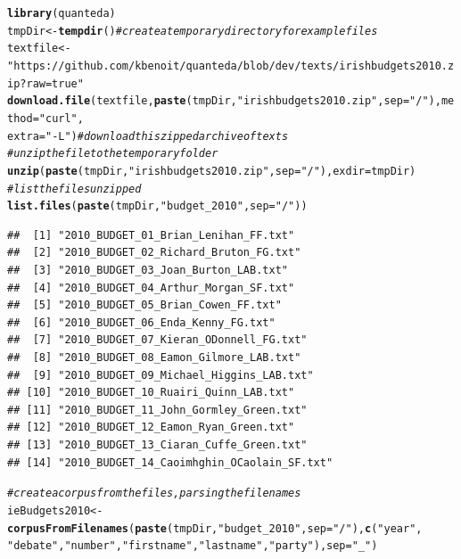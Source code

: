 \documentclass[11pt]{article}\usepackage[]{graphicx}\usepackage[]{color}
\makeatletter
\newcommand{\hlstr}[1]{\textcolor[rgb]{0.192,0.494,0.8}{#1}}%
\newcommand{\hlcom}[1]{\textcolor[rgb]{0.678,0.584,0.686}{\textit{#1}}}%
\newcommand{\hlstd}[1]{\textcolor[rgb]{0.345,0.345,0.345}{#1}}%
\newcommand{\hlkwb}[1]{\textcolor[rgb]{0.69,0.353,0.396}{#1}}%
\newcommand{\hlkwc}[1]{\textcolor[rgb]{0.333,0.667,0.333}{#1}}%
\newcommand{\hlkwd}[1]{\textcolor[rgb]{0.737,0.353,0.396}{\textbf{#1}}}%
\newenvironment{kframe}{%
 \def\at@end@of@kframe{}%
 \ifinner\ifhmode%
  \def\at@end@of@kframe{\end{minipage}}%
  \begin{minipage}{\columnwidth}%
 \fi\fi%
 \def\FrameCommand##1{\hskip\@totalleftmargin \hskip-\fboxsep
 \colorbox{shadecolor}{##1}\hskip-\fboxsep
     \hskip-\linewidth \hskip-\@totalleftmargin \hskip\columnwidth}%
 \MakeFramed {\advance\hsize-\width
   \@totalleftmargin\z@ \linewidth\hsize
   \@setminipage}}%
 {\par\unskip\endMakeFramed%
 \at@end@of@kframe}
\newenvironment{knitrout}{}{} %
\makeatother
\begin{document}
\begin{knitrout}\footnotesize
{}\color{fgcolor}\begin{kframe}
\begin{alltt}
\hlkwd{library}\hlstd{(quanteda)}
\hlstd{tmpDir} \hlkwb{<-} \hlkwd{tempdir}\hlstd{()}  \hlcom{# create a temporary directory for example files}
\hlstd{textfile} \hlkwb{<-} \hlstr{"https://github.com/kbenoit/quanteda/blob/dev/texts/irishbudgets2010.zip?raw=true"}
\hlkwd{download.file}\hlstd{(textfile,} \hlkwd{paste}\hlstd{(tmpDir,} \hlstr{"irishbudgets2010.zip"}\hlstd{,} \hlkwc{sep} \hlstd{=} \hlstr{"/"}\hlstd{),} \hlkwc{method} \hlstd{=} \hlstr{"curl"}\hlstd{,}
    \hlkwc{extra} \hlstd{=} \hlstr{"-L"}\hlstd{)}  \hlcom{# download this zipped archive of texts}
\hlcom{# unzip the file to the temporary folder}
\hlkwd{unzip}\hlstd{(}\hlkwd{paste}\hlstd{(tmpDir,} \hlstr{"irishbudgets2010.zip"}\hlstd{,} \hlkwc{sep} \hlstd{=} \hlstr{"/"}\hlstd{),} \hlkwc{exdir} \hlstd{= tmpDir)}
\hlcom{# list the files unzipped}
\hlkwd{list.files}\hlstd{(}\hlkwd{paste}\hlstd{(tmpDir,} \hlstr{"budget_2010"}\hlstd{,} \hlkwc{sep} \hlstd{=} \hlstr{"/"}\hlstd{))}
\end{alltt}
\begin{verbatim}
##  [1] "2010_BUDGET_01_Brian_Lenihan_FF.txt"      
##  [2] "2010_BUDGET_02_Richard_Bruton_FG.txt"     
##  [3] "2010_BUDGET_03_Joan_Burton_LAB.txt"       
##  [4] "2010_BUDGET_04_Arthur_Morgan_SF.txt"      
##  [5] "2010_BUDGET_05_Brian_Cowen_FF.txt"        
##  [6] "2010_BUDGET_06_Enda_Kenny_FG.txt"         
##  [7] "2010_BUDGET_07_Kieran_ODonnell_FG.txt"    
##  [8] "2010_BUDGET_08_Eamon_Gilmore_LAB.txt"     
##  [9] "2010_BUDGET_09_Michael_Higgins_LAB.txt"   
## [10] "2010_BUDGET_10_Ruairi_Quinn_LAB.txt"      
## [11] "2010_BUDGET_11_John_Gormley_Green.txt"    
## [12] "2010_BUDGET_12_Eamon_Ryan_Green.txt"      
## [13] "2010_BUDGET_13_Ciaran_Cuffe_Green.txt"    
## [14] "2010_BUDGET_14_Caoimhghin_OCaolain_SF.txt"
\end{verbatim}
\begin{alltt}
\hlcom{# create a corpus from the files, parsing the filenames}
\hlstd{ieBudgets2010} \hlkwb{<-} \hlkwd{corpusFromFilenames}\hlstd{(}\hlkwd{paste}\hlstd{(tmpDir,} \hlstr{"budget_2010"}\hlstd{,} \hlkwc{sep} \hlstd{=} \hlstr{"/"}\hlstd{),} \hlkwd{c}\hlstd{(}\hlstr{"year"}\hlstd{,}
    \hlstr{"debate"}\hlstd{,} \hlstr{"number"}\hlstd{,} \hlstr{"firstname"}\hlstd{,} \hlstr{"lastname"}\hlstd{,} \hlstr{"party"}\hlstd{),} \hlkwc{sep} \hlstd{=} \hlstr{"_"}\hlstd{)}
\end{alltt}
\end{kframe}
\end{knitrout}
\end{document}
